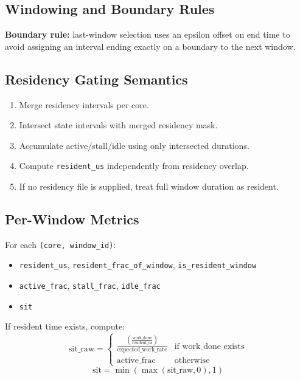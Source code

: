 \documentclass[11pt,a4paper]{article}
\begin{document}
\subsection{Windowing and Boundary Rules}


\textbf{Boundary rule:} last-window selection uses an epsilon offset on end time to avoid assigning an interval ending exactly on a boundary to the next window.

\subsection{Residency Gating Semantics}
\begin{enumerate}[leftmargin=1.4em]
  \item Merge residency intervals per core.
  \item Intersect state intervals with merged residency mask.
  \item Accumulate active/stall/idle using only intersected durations.
  \item Compute \texttt{resident\_us} independently from residency overlap.
  \item If no residency file is supplied, treat full window duration as resident.
\end{enumerate}

\subsection{Per-Window Metrics}
For each \texttt{(core, window\_id)}:
\begin{itemize}[leftmargin=1.4em]
  \item \texttt{resident\_us}, \texttt{resident\_frac\_of\_window}, \texttt{is\_resident\_window}
  \item \texttt{active\_frac}, \texttt{stall\_frac}, \texttt{idle\_frac}
  \item \texttt{sit}
\end{itemize}

If resident time exists, compute:
\[
\text{sit\_raw} =
\begin{cases}
\frac{\left(\frac{\text{work\_done}}{\text{resident\_us}}\right)}{\text{expected\_work\_rate}} & \text{if work\_done exists} \\
\text{active\_frac} & \text{otherwise}
\end{cases}
\]
\[
\text{sit} = \min(\max(\text{sit\_raw}, 0), 1)
\]
\end{document}
